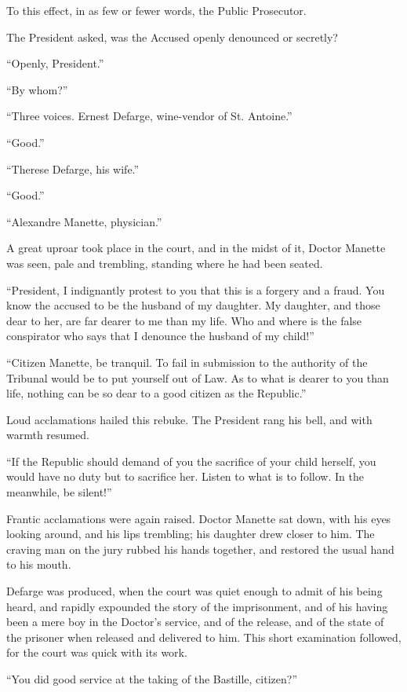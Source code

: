 To this effect, in as few or fewer words, the Public Prosecutor.

The President asked, was the Accused openly denounced or secretly?

``Openly, President.''

``By whom?''

``Three voices.  Ernest Defarge, wine-vendor of St. Antoine.''

``Good.''

``Therese Defarge, his wife.''

``Good.''

``Alexandre Manette, physician.''

A great uproar took place in the court, and in the midst of it,
Doctor Manette was seen, pale and trembling, standing where he had
been seated.

``President, I indignantly protest to you that this is a forgery and a
fraud.  You know the accused to be the husband of my daughter.  My
daughter, and those dear to her, are far dearer to me than my life.
Who and where is the false conspirator who says that I denounce the
husband of my child!''

``Citizen Manette, be tranquil.  To fail in submission to the
authority of the Tribunal would be to put yourself out of Law.
As to what is dearer to you than life, nothing can be so dear to a
good citizen as the Republic.''

Loud acclamations hailed this rebuke.  The President rang his bell,
and with warmth resumed.

``If the Republic should demand of you the sacrifice of your child
herself, you would have no duty but to sacrifice her.  Listen to what
is to follow.  In the meanwhile, be silent!''

Frantic acclamations were again raised.  Doctor Manette sat down,
with his eyes looking around, and his lips trembling; his daughter
drew closer to him.  The craving man on the jury rubbed his hands
together, and restored the usual hand to his mouth.

Defarge was produced, when the court was quiet enough to admit of his
being heard, and rapidly expounded the story of the imprisonment, and
of his having been a mere boy in the Doctor's service, and of the
release, and of the state of the prisoner when released and delivered
to him.  This short examination followed, for the court was quick
with its work.

``You did good service at the taking of the Bastille, citizen?''


